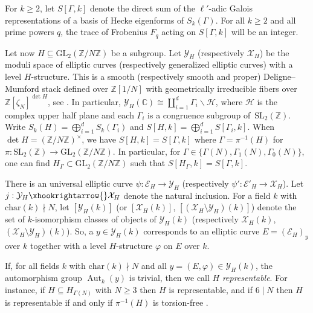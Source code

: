 \documentclass[10pt]{article}
\theoremstyle{definition}
\let\phi\varphi
\DeclareMathOperator\Aut{Aut}
\renewcommand\char{\text{char}}
\renewcommand{\:}{\colon}
\begin{document}
For $k \geq 2$, let $S[\Gamma,k]$ denote the direct sum of the $\ell'$-adic Galois representations of a basis of Hecke eigenforms of $S_{k}(\Gamma)$.
For all $k\geq 2$ and all prime powers $q$, the trace of Frobenius $F_q$ acting on $S[\Gamma,k]$ will be an integer. 

Let now $H \subseteq \mathrm{GL}_2(\mathbb Z/N\mathbb Z)$ be a subgroup. 
Let $\mathcal Y_{H}$ (respectively $\mathcal X_{H}$) be the moduli space of elliptic curves (respectively generalized elliptic curves) with a level $H$-structure. This is a smooth (respectively smooth and proper) Deligne--Mumford stack defined over $\mathbb Z[1/N]$ with geometrically irreducible fibers over $\mathbb Z[\zeta_N]^{\det H}$, see \cite[Section IV.3 and IV.5]{DeligneRapoport}. In particular, $\mathcal Y_{H}(\mathbb C) \cong \coprod_{i=1}^d \Gamma_i \backslash \mathcal H$, where $\mathcal H$ is the complex upper half plane and each $\Gamma_i$ is a congruence subgroup of~$\mathrm{SL}_2(\mathbb Z)$. Write $S_k(H) = \bigoplus_{i=1}^d S_k(\Gamma_i)$ and $S[H,k] = \bigoplus_{i=1}^d S[\Gamma_i,k]$. 
When $\det H = (\mathbb Z/N\mathbb Z)^\times$, we have $S[H,k] = S[\Gamma,k]$ where $\Gamma = \pi^{-1}(H)$ for $\pi: \mathrm{SL}_2(\mathbb Z) \to \mathrm{GL}_2(\mathbb Z/N\mathbb Z)$. In particular, for $\Gamma \in \{\Gamma(N), \Gamma_1(N), \Gamma_0(N)\}$, one can find $H_\Gamma \subset \mathrm{GL}_2(\mathbb Z/N\mathbb Z)$ such that $S[H_\Gamma,k] = S[\Gamma,k]$. 

There is an universal elliptic curve $\psi: \mathcal E_H \to \mathcal Y_{H}$ (respectively $\psi':\mathcal E'_H \to \mathcal X_{H}$). Let $j: \mathcal Y_{H} \xhookrightarrow{} \mathcal X_{H}$ denote the natural inclusion.  For a field $k$ with $\char(k) \nmid N$, let $[\mathcal Y_{H}(k)]$ (or $[\mathcal X_{H}(k)]$, $[(\mathcal X_{H} \setminus \mathcal Y_{H})(k)]$) denote the set of $k$-isomorphism classes of objects of $\mathcal Y_{H}(k)$ (respectively $\mathcal X_{H}(k)$, $(\mathcal X_{H} \setminus \mathcal Y_{H})(k)$). So, a $y \in \mathcal Y_{H}(k)$ corresponds to an elliptic curve $E=(\mathcal E_H)_y$ over $k$ together with a level $H$-structure $\phi$ on $E$ over $k$. 

If, for all fields $k$ with $\char(k) \nmid N$ and all $y=(E,\phi) \in \mathcal Y_{H}(k)$, the automorphism group $\Aut_{k}(y)$ is trivial, then we call $H$ \emph{representable}. For instance, if 
$H \subseteq H_{\Gamma(N)}$ with $N \geq 3$ then $H$ is representable, and if $6 \mid N$ then $H$ is representable if and only if $\pi^{-1}(H)$ is torsion-free \cite[Th\'eor\`emes IV.2.7, VI.2.7]{DeligneRapoport}. 
\end{document}
